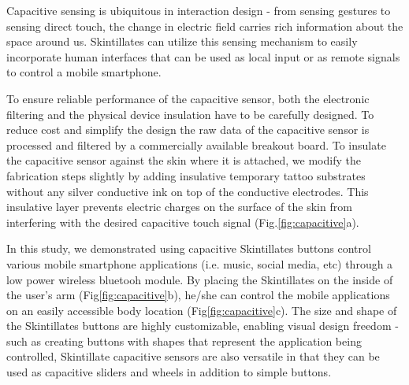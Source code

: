 \documentclass{sigchi}
\begin{document}
Capacitive sensing is ubiquitous in interaction design - from sensing gestures to sensing direct touch, the change in electric field carries rich information about the space around us. Skintillates can utilize this sensing mechanism to easily incorporate human interfaces that can be used as local input or as remote signals to control a mobile smartphone.

To ensure reliable performance of the capacitive sensor, both the electronic filtering and the physical device insulation have to be carefully designed. To reduce cost and simplify the design the raw data of the capacitive sensor is processed and filtered by a commercially available breakout board\footnotemark. To insulate the capacitive sensor against the skin where it is attached, we modify the fabrication steps slightly by adding insulative temporary tattoo substrates without any silver conductive ink on top of the conductive electrodes. This insulative layer prevents electric charges on the surface of the skin from interfering with the desired capacitive touch signal (Fig.\ref{fig:capacitive}a). 

In this study, we demonstrated using capacitive Skintillates buttons control various mobile smartphone applications (i.e. music, social media, etc) through a low power wireless bluetooh module\footnotemark. By placing the Skintillates on the inside of the user’s arm (Fig\ref{fig:capacitive}b), he/she can control the mobile applications on an easily accessible body location (Fig\ref{fig:capacitive}c). The size and shape of the Skintillates buttons are highly customizable, enabling visual design freedom - such as creating buttons with shapes that represent the application being controlled, Skintillate capacitive sensors are also versatile in that they can be used  as capacitive sliders and wheels in addition to simple buttons.

\end{document}
